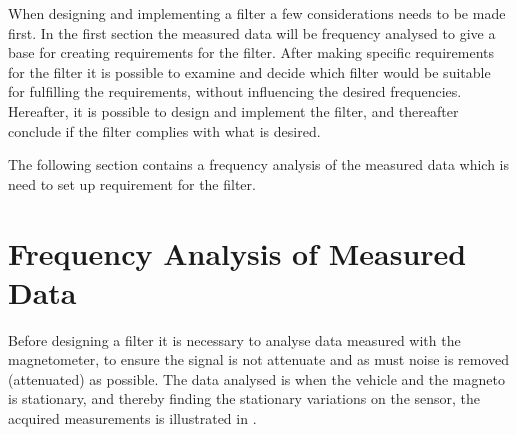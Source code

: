 When designing and implementing a filter a few considerations needs to be made first. In the first section the measured data will be frequency analysed to give a base for creating requirements for the filter. After making specific requirements for the filter it is possible to examine and decide which filter would be suitable for fulfilling the requirements, without influencing the desired frequencies. Hereafter, it is possible to design and implement the filter, and thereafter conclude if the filter complies with what is desired.

The following section contains a frequency analysis of the measured data which is need to set up requirement for the filter.

\section{Frequency Analysis of Measured Data}
Before designing a filter it is necessary to analyse data measured with the magnetometer, to ensure the signal is not attenuate and as must noise is removed (attenuated) as possible. The data analysed is when the vehicle and the magneto is stationary, and thereby finding the stationary variations on the sensor, the acquired measurements is illustrated in .

